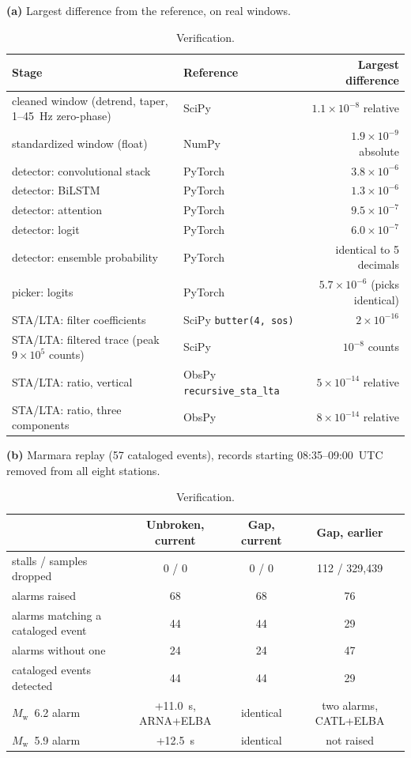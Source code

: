 \documentclass[11pt,a4paper]{article}
\newcommand{\Mw}{$M_\mathrm{w}$}
\newcommand{\stalta}{STA/LTA}
\newcommand{\panel}[1]{\par\smallskip\noindent\textbf{(#1)}\enskip}
\begin{document}
\begin{table}[htbp]
  \centering\footnotesize\setlength{\tabcolsep}{4pt}
  \caption{Verification.}\label{t:verification}
  \panel{a} Largest difference from the reference, on real windows.\par\smallskip
  \begin{tabular}{@{}llr@{}}
    \toprule
    Stage & Reference & Largest difference \\
    \midrule
    cleaned window (detrend, taper, 1--45~Hz zero-phase) & SciPy & $1.1\times10^{-8}$ relative \\
    standardized window (float) & NumPy & $1.9\times10^{-9}$ absolute \\
    detector: convolutional stack & PyTorch & $3.8\times10^{-6}$ \\
    detector: BiLSTM & PyTorch & $1.3\times10^{-6}$ \\
    detector: attention & PyTorch & $9.5\times10^{-7}$ \\
    detector: logit & PyTorch & $6.0\times10^{-7}$ \\
    detector: ensemble probability & PyTorch & identical to 5 decimals \\
    picker: logits & PyTorch & $5.7\times10^{-6}$ (picks identical) \\
    \stalta{}: filter coefficients & SciPy \texttt{butter(4, sos)} & $2\times10^{-16}$ \\
    \stalta{}: filtered trace (peak $9\times10^{5}$ counts) & SciPy & $10^{-8}$ counts \\
    \stalta{}: ratio, vertical & ObsPy \texttt{recursive\_sta\_lta} & $5\times10^{-14}$ relative \\
    \stalta{}: ratio, three components & ObsPy & $8\times10^{-14}$ relative \\
    \bottomrule
  \end{tabular}

  \bigskip
  \panel{b} Marmara replay (57 cataloged events), records starting
  08:35--09:00~UTC removed from all eight stations.\par\smallskip
  \begin{tabular}{@{}lccc@{}}
    \toprule
    & Unbroken, current & Gap, current & Gap, earlier \\
    \midrule
    stalls / samples dropped & 0 / 0 & 0 / 0 & 112 / 329{,}439 \\
    alarms raised & 68 & 68 & 76 \\
    alarms matching a cataloged event & 44 & 44 & 29 \\
    alarms without one & 24 & 24 & 47 \\
    cataloged events detected & 44 & 44 & 29 \\
    \Mw{}~6.2 alarm & +11.0~s, ARNA+ELBA & identical & two alarms, CATL+ELBA \\
    \Mw{}~5.9 alarm & +12.5~s & identical & not raised \\
    \bottomrule
  \end{tabular}
\end{table}
\end{document}
